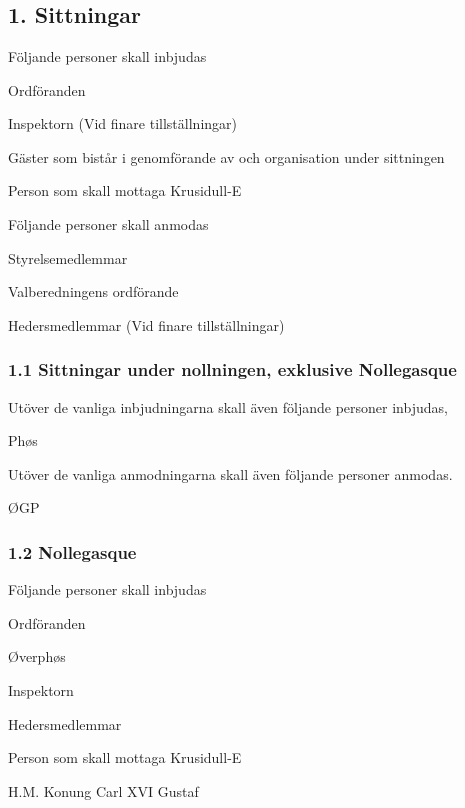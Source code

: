 \documentclass[10pt]{article}
\begin{document}
\section*{\doctitle}

\subsection*{1. Sittningar}
Följande personer skall inbjudas
\begin{dashlist}
    \item Ordföranden
    \item Inspektorn (Vid finare tillställningar) 
    \item Gäster som bistår i genomförande av och organisation under sittningen
    \item Person som skall mottaga Krusidull-E
    
\end{dashlist}
Följande personer skall anmodas
\begin{dashlist}
    \item Styrelsemedlemmar
    \item Valberedningens ordförande
    \item Hedersmedlemmar (Vid finare tillställningar) 
\end{dashlist}

\subsubsection*{1.1 Sittningar under nollningen, exklusive Nollegasque}
Utöver de vanliga inbjudningarna skall även följande personer inbjudas, 
\begin{dashlist}
    \item Phøs
\end{dashlist}
Utöver de vanliga anmodningarna skall även följande personer anmodas. 
\begin{dashlist}
    \item ØGP
\end{dashlist}

\subsubsection*{1.2 Nollegasque}
Följande personer skall inbjudas
    \begin{dashlist}
        \item Ordföranden
        \item Øverphøs
        \item Inspektorn
        \item Hedersmedlemmar
        \item Person som skall mottaga Krusidull-E
        \item H.M. Konung Carl XVI Gustaf
    \end{dashlist}
\end{document}
